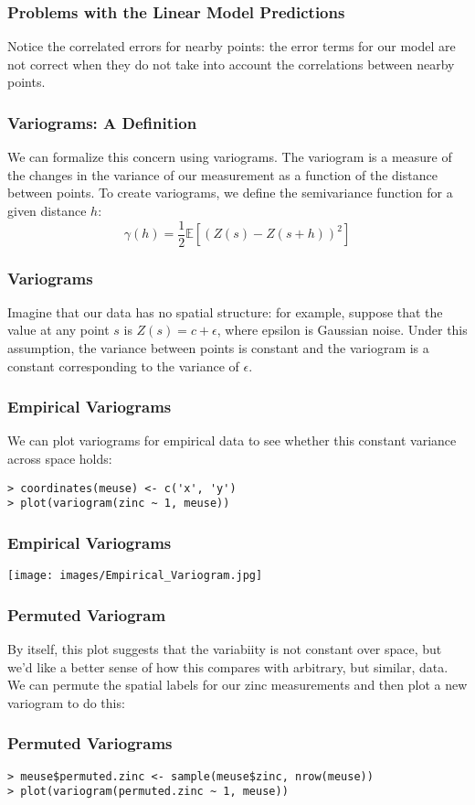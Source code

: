 \documentclass{beamer}
\begin{document}
\frame
{
	\frametitle{Problems with the Linear Model Predictions}

	Notice the correlated errors for nearby points: the error terms for our model are not correct when they do not take into account the correlations between nearby points.
}

\frame
{
	\frametitle{Variograms: A Definition}
	
	We can formalize this concern using variograms. The variogram is a measure of the changes in the variance of our measurement as a function of the distance between points. To create variograms, we define the semivariance function for a given distance $h$:
	\[
		\gamma(h) = \frac{1}{2} \mathbb{E}[ (Z(s) - Z(s + h))^2]
	\]
}

\frame
{
	\frametitle{Variograms}
	
	Imagine that our data has no spatial structure: for example, suppose that the value at any point $s$ is $Z(s) = c + \epsilon$, where epsilon is Gaussian noise. Under this assumption, the variance between points is constant and the variogram is a constant corresponding to the variance of $\epsilon$.
}

\begin{frame}[fragile]
	\frametitle{Empirical Variograms}
	
	We can plot variograms for empirical data to see whether this constant variance across space holds:
	
	\begin{verbatim}
> coordinates(meuse) <- c('x', 'y')
> plot(variogram(zinc ~ 1, meuse))
	\end{verbatim}
\end{frame}

\frame
{
	\frametitle{Empirical Variograms}

	\begin{center}
		\texttt{[image: images/Empirical\_Variogram.jpg]}
	\end{center}
}

\frame
{
	\frametitle{Permuted Variogram}
	
	By itself, this plot suggests that the variabiity is not constant over space, but we'd like a better sense of how this compares with arbitrary, but similar, data. We can permute the spatial labels for our zinc measurements and then plot a new variogram to do this:
}

\begin{frame}[fragile]
	\frametitle{Permuted Variograms}
	
	\begin{verbatim}
> meuse$permuted.zinc <- sample(meuse$zinc, nrow(meuse))
> plot(variogram(permuted.zinc ~ 1, meuse))
	\end{verbatim}
\end{frame}
\end{document}
